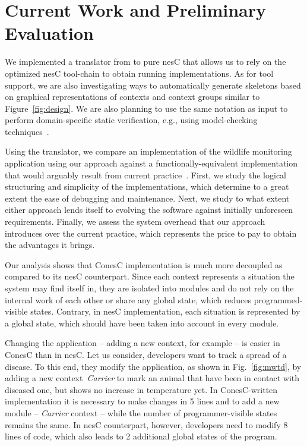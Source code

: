 \section{Current Work and Preliminary Evaluation}
\label{sec:eval}

We implemented a translator from \conesc to pure nesC that allows us
to rely on the optimized nesC tool-chain to obtain running
implementations. As for tool support, we are also investigating ways
to automatically generate \conesc skeletons based on graphical
representations of contexts and context groups similar to
Figure~\ref{fig:design}. We are also planning to use the same notation
as input to perform domain-specific static verification, e.g., using
model-checking techniques~\cite{mottolaicse}.

Using the translator, we compare an implementation of the wildlife
monitoring application using our approach against a
functionally-equivalent implementation that would arguably result from
current practice~\cite{programmingsurvey,badgersEWSN}. First, we study
the logical structuring and simplicity of the implementations, which
determine to a great extent the ease of debugging and
maintenance. Next, we study to what extent either approach lends
itself to evolving the software against initially unforeseen
requirements. Finally, we assess the system overhead that our approach
introduces over the current practice, which represents the price to
pay to obtain the advantages it brings.


Our analysis shows that ConesC implementation is much more decoupled as
compared to its nesC counterpart. Since each context represents a situation
the system may find itself in, they are isolated into modules and do not rely
on the internal work of each other or share any global state, which reduces
programmed-visible states. Contrary, in nesC implementation, each situation
is represented by a global state, which should have been taken into account
in every module.


Changing the application -- adding a new context, for example -- is easier in
ConesC than in nesC. Let us consider, developers want to track a spread of a
disease. To this end, they modify the application, as shown in Fig.~\ref{fig:mwtd},
by adding a new context~\emph{Carrier} to mark an animal that have been in
contact with diseased one, but shows no increase in temperature yet. In
ConesC-written implementation it is necessary to make changes in 5 lines and
to add a new module -- \emph{Carrier} context -- while the number of
programmer-visible states remains the same. In nesC counterpart, however,
developers need to modify 8 lines of code, which also leads to 2 additional
global states of the program.


